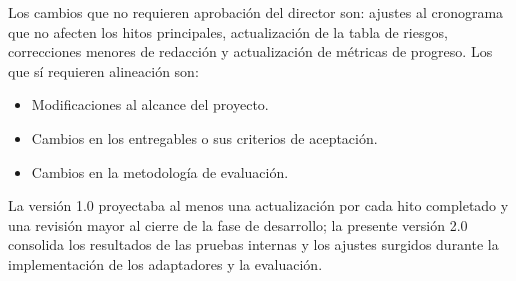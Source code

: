Los cambios que no requieren aprobación del director son: ajustes al cronograma que no afecten los hitos principales, actualización de la tabla de riesgos, correcciones menores de redacción y actualización de métricas de progreso. Los que sí requieren alineación son:

\begin{itemize}
  \item Modificaciones al alcance del proyecto.
  \item Cambios en los entregables o sus criterios de aceptación.
  \item Cambios en la metodología de evaluación.
\end{itemize}

La versión 1.0 proyectaba al menos una actualización por cada hito completado y una revisión mayor al cierre de la fase de desarrollo; la presente versión 2.0 consolida los resultados de las pruebas internas y los ajustes surgidos durante la implementación de los adaptadores y la evaluación.
